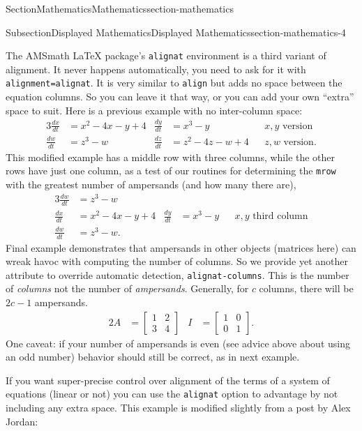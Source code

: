 \documentclass[twoside,10pt,]{article}
\newcommand{\mono}[1]{\texttt{#1}}
\numberwithin{equation}{section}
\newcommand{\amp}{&}
\begin{document}
\begin{sectionptx}{Section}{Mathematics}{}{Mathematics}{}{}{section-mathematics}
\begin{subsectionptx}{Subsection}{Displayed Mathematics}{}{Displayed Mathematics}{}{}{section-mathematics-4}
%
\par
The AMSmath \LaTeX{} package's \mono{alignat} environment is a third variant of alignment.  It never happens automatically, you need to ask for it with \mono{alignment=\textquotedbl{}alignat\textquotedbl{}}.  It is very similar to \mono{align} but adds no space between the equation columns.  So you can leave it that way, or you can add your own ``extra'' space to suit.  Here is a previous example with no inter-column space:%
\begin{alignat*}{3}
\frac{dx}{dt} \amp = x^2 - 4x - y + 4 \amp \frac{dy}{dt} \amp = x^3 - y          \amp\amp x, y\text{ version}\\
\frac{dw}{dt} \amp = z^3 - w          \amp \frac{dz}{dt} \amp = z^2 - 4z - w + 4 \amp\amp z, w\text{ version}\text{.}
\end{alignat*}
This modified example has a middle row with three columns, while the other rows have just one column, as a test of our routines for determining the \mono{mrow} with the greatest number of ampersands (and how many there are),%
\begin{alignat*}{3}
\frac{dw}{dt} &= z^3 - w\\
\frac{dx}{dt} &= x^2 - 4x - y + 4 & \frac{dy}{dt} &= x^3 - y&& x, y\text{ third column}\\
\frac{dw}{dt} & = z^3 - w\text{.}
\end{alignat*}
Final example demonstrates that ampersands in other objects (matrices here) can wreak havoc with computing the number of columns.  So we provide yet another attribute to override automatic detection, \mono{alignat-columns}.  This is the number of \emph{columns} not the number of \emph{ampersands}.  Generally, for \(c\) columns, there will be \(2c-1\) ampersands.%
\begin{alignat*}{2}
A &= \begin{bmatrix}1 & 2 \\ 3 & 4\end{bmatrix}
&
I &= \begin{bmatrix}1 & 0 \\ 0 & 1\end{bmatrix}\text{.}
\end{alignat*}
One caveat: if your number of ampersands is even (see advice above about using an odd number) behavior should still be correct, as in next example.%
\par
If you want super-precise control over alignment of the terms of a system of equations (linear or not) you can use the \mono{alignat} option to advantage by not including any extra space.  This example is modified slightly from a post by Alex Jordan:%

\end{subsectionptx}
\end{sectionptx}
\end{document}
